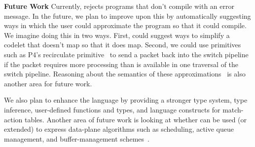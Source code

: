 \textbf{Future Work}
Currently, \pktlanguage rejects programs that don't compile with an error
message.  In the future, we plan to improve upon this by automatically
suggesting ways in which the user could approximate the program so that it
could compile. We imagine doing this in two ways. First, \pktlanguage could
suggest ways to simplify a codelet that doesn't map so that it does map.
Second, we could use primitives such as P4's recirculate
primitive~\cite{p4spec} to send a packet back into the switch pipeline if the
packet requires more processing than is available in one traversal of the
switch pipeline. Reasoning about the semantics of these
approximations~\cite{sampsonApprox, chisel} is also another area for future
work.

We also plan to enhance the \pktlanguage language by providing a stronger type
system, type inference, user-defined functions and types, and language
constructs for match-action tables. Another area of future work is looking at
whether \pktlanguage can be used (or extended) to express data-plane algorithms
such as scheduling, active queue management, and buffer-management
schemes~\cite{broadcom_buffer}.
